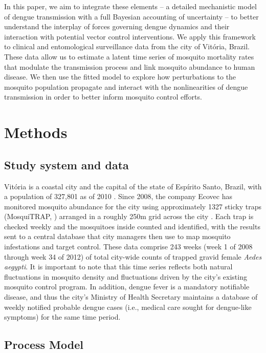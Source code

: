 \documentclass[10pt,letterpaper]{article}
\begin{document}
In this paper, we aim to integrate these elements -- a detailed mechanistic model of dengue transmission with a full Bayesian accounting of uncertainty --  to better understand the interplay of forces governing dengue dynamics and their interaction with potential vector control interventions.
We apply this framework to clinical and entomological surveillance data from the city of Vit\'oria, Brazil.
These data allow us to estimate a latent time series of mosquito mortality rates that modulate the transmission process and link mosquito abundance to human disease.  
We then use the fitted model to explore how perturbations to the mosquito population propagate and interact with the nonlinearities of dengue transmission in order to better inform mosquito control efforts.

\section*{Methods}

\subsection*{Study system and data}

Vit\'oria is a coastal city and the capital of the state of Esp\'irito Santo, Brazil, with a population of 327,801 as of 2010 \cite{vitpop}.
Since 2008, the company Ecovec has monitored mosquito abundance for the city using approximately 1327 sticky traps (MosquiTRAP, \cite{Eiras2009}) arranged in a roughly 250m grid across the city \cite{Pepin2015, Lana2018}.
Each trap is checked weekly and the mosquitoes inside counted and identified, with the results sent to a central database that city managers then use to map mosquito infestations and target control.
These data comprise 243 weeks (week 1 of 2008 through week 34 of 2012) of total city-wide counts of trapped gravid female \emph{Aedes aegypti}.
It is important to note that this time series reflects both natural fluctuations in mosquito density and fluctuations driven by the city's existing mosquito control program.
In addition, dengue fever is a mandatory notifiable disease, and thus the city's Ministry of Health Secretary maintains a database of weekly notified probable dengue cases (i.e., medical care sought for dengue-like symptoms) for the same time period.

\subsection*{Process Model}
\end{document}

